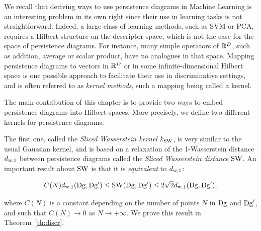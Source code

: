 We recall that deriving ways to use persistence diagrams in Machine Learning is an interesting problem in its own right
since their use in learning tasks is not straightforward.
Indeed, a large class of learning methods, such as SVM or PCA, requires
a Hilbert structure on the descriptor space, which is not the case
for the space of persistence diagrams. For instance, many simple operators of $\mathbb{R}^D$, such
as addition, average or scalar product, have no analogues in that
space. Mapping persistence diagrams to vectors in $\mathbb{R}^D$ or in some infinite-dimensional Hilbert space 
is one possible approach to facilitate their use in discriminative settings, and is often referred to as
{\em kernel methods}, such a mapping being called a kernel. 

The main contribution of this chapter is to provide two ways to embed persistence diagrams into Hilbert spaces.  
More precisely, we define two different kernels for
persistence diagrams. 

The first one, called the {\em Sliced Wasserstein kernel} $k_{\rm SW}$, is very similar to the usual Gaussian kernel, and %
is based on a relaxation of the 1-Wasserstein distance $d_{{\rm w},1}$ between persistence diagrams called the {\em Sliced Wasserstein distance} ${\rm SW}$.
An important result about ${\rm SW}$ is that it is {\em equivalent} to $d_{{\rm w},1}$:

$$C(N)d_{{\rm w},1}(\mathrm{Dg},\mathrm{Dg}') \leq {\rm SW}(\mathrm{Dg},\mathrm{Dg}') \leq 2\sqrt{2}d_{{\rm w},1}(\mathrm{Dg},\mathrm{Dg}'),$$

where $C(N)$ is a constant depending on the number of points $N$ in $\mathrm{Dg}$ and $\mathrm{Dg}'$, and such that $C(N)\rightarrow 0$ as $N\rightarrow+\infty$.
We prove this result in Theorem~\ref{th:discr}.


